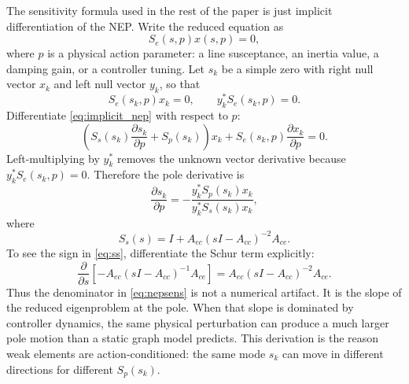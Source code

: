 \documentclass[conference]{IEEEtran}
\begin{document}
The sensitivity formula used in the rest of the paper is just implicit
differentiation of the NEP. Write the reduced equation as
\begin{equation}
  S_e(s,p)x(s,p)=0,
  \label{eq:implicit_nep}
\end{equation}
where $p$ is a physical action parameter: a line susceptance, an inertia value,
a damping gain, or a controller tuning. Let $s_k$ be a simple zero with right
null vector $x_k$ and left null vector $y_k$, so that
\begin{equation}
  S_e(s_k,p)x_k=0,\qquad y_k^\ast S_e(s_k,p)=0 .
  \label{eq:left_right_null}
\end{equation}
Differentiate \eqref{eq:implicit_nep} with respect to $p$:
\begin{equation}
  \left(S_s(s_k)\frac{\partial s_k}{\partial p}
  +S_p(s_k)\right)x_k
  +S_e(s_k,p)\frac{\partial x_k}{\partial p}=0 .
  \label{eq:implicit_diff}
\end{equation}
Left-multiplying by $y_k^\ast$ removes the unknown vector derivative because
$y_k^\ast S_e(s_k,p)=0$. Therefore the pole derivative is
\begin{equation}
  \frac{\partial s_k}{\partial p}
  =
  -\frac{y_k^\ast S_p(s_k)x_k}{y_k^\ast S_s(s_k)x_k},
  \label{eq:nepsens}
\end{equation}
where
\begin{equation}
  S_s(s)=I+A_{ec}(sI-A_{cc})^{-2}A_{ce}.
  \label{eq:ss}
\end{equation}
To see the sign in \eqref{eq:ss}, differentiate the Schur term explicitly:
\begin{equation}
  \frac{\partial}{\partial s}
  \left[-A_{ec}(sI-A_{cc})^{-1}A_{ce}\right]
  =
  A_{ec}(sI-A_{cc})^{-2}A_{ce}.
  \label{eq:schur_derivative_step}
\end{equation}
Thus the denominator in \eqref{eq:nepsens} is not a numerical artifact. It is
the slope of the reduced eigenproblem at the pole. When that slope is dominated
by controller dynamics, the same physical perturbation can produce a much larger
pole motion than a static graph model predicts.
This derivation is the reason weak elements are action-conditioned: the same
mode $s_k$ can move in different directions for different $S_p(s_k)$.
\end{document}
